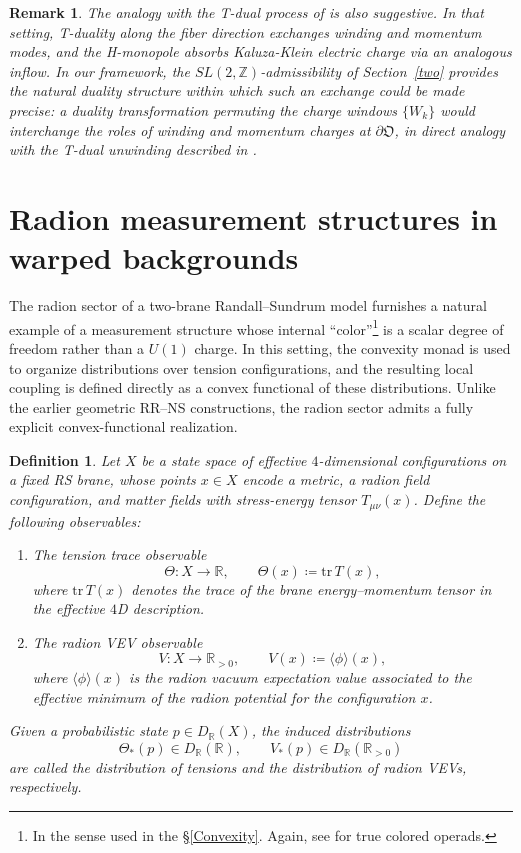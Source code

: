 \documentclass{article}
\newtheorem{dn}{Definition}
\newtheorem{rk}{Remark}
\numberwithin{tm}{section}
\numberwithin{dn}{section}
\numberwithin{as}{section}
\numberwithin{rk}{section}
\numberwithin{lem}{section}
\numberwithin{ax}{section}
\numberwithin{pp}{section}
\numberwithin{eg}{section}
\numberwithin{war}{section}
\numberwithin{equation}{section}
\numberwithin{prop}{section}
\numberwithin{nt}{section}
\numberwithin{rc}{section}
\numberwithin{setup}{section}
\begin{document}
\begin{rk}
	The analogy with the T-dual process of \cite{GHM} is also suggestive. In that setting, T-duality along the fiber direction exchanges winding and momentum modes, and the H-monopole absorbs Kaluza-Klein electric charge via an analogous inflow. In our framework, the $SL(2,\mathbb{Z})$-admissibility of Section~\ref{two} provides the natural duality structure within which such an exchange could be made precise: a duality transformation permuting the charge windows $\{W_k\}$ would interchange the roles of winding and momentum charges at $\partial\mathfrak{O}$, in direct analogy with the T-dual unwinding described in \cite{GHM}.
\end{rk}
	
	\section{Radion measurement structures in warped backgrounds}
	
	The radion sector of a two-brane Randall--Sundrum model \cite{Karmakar} furnishes a natural example of a measurement structure whose internal ``color''\footnote{In the sense used in the \S\ref{Convexity}. Again, see \cite{Yau} for true colored operads.} is a scalar degree of freedom rather than a $U(1)$ charge. In this setting, the convexity monad is used to organize distributions over tension configurations, and the resulting local coupling is defined directly as a convex functional of these distributions. Unlike the earlier geometric RR–NS constructions, the radion sector admits a fully explicit convex-functional realization.
	
	\begin{dn}
		Let $X$ be a state space of effective $4$-dimensional configurations on a fixed RS brane, whose points $x \in X$ encode a metric, a radion field configuration, and matter fields with stress-energy tensor $T_{\mu\nu}(x)$. Define the following observables:
		\begin{enumerate}
			\item The \emph{tension trace} observable
			\[
			\Theta : X \longrightarrow \mathbb{R}, \qquad
			\Theta(x) \coloneq \mathrm{tr}\,T(x),
			\]
			where $\mathrm{tr}\,T(x)$ denotes the trace of the brane energy--momentum tensor in the effective $4$D description.
			\item The \emph{radion VEV} observable
			\[
			V : X \longrightarrow \mathbb{R}_{>0}, \qquad
			V(x) \coloneq \langle \phi \rangle(x),
			\]
			where $\langle \phi \rangle(x)$ is the radion vacuum expectation value associated to the effective minimum of the radion potential for the configuration $x$.
		\end{enumerate}
		Given a probabilistic state $p \in D_{\mathbb{R}}(X)$, the induced distributions
		\[
		\Theta_* (p) \in D_{\mathbb{R}}(\mathbb{R}), \qquad
		V_* (p) \in D_{\mathbb{R}}(\mathbb{R}_{>0})
		\]
		are called the \emph{distribution of tensions} and the \emph{distribution of radion VEVs}, respectively.
	\end{dn}
	
\end{document}
